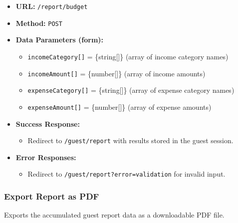 \begin{itemize}
    \item \textbf{URL:} \texttt{/report/budget}
    \item \textbf{Method:} \texttt{POST}
    \item \textbf{Data Parameters (form):}
    \begin{itemize}
        \item \texttt{incomeCategory[]} = \{string[]\} (array of income category names)
        \item \texttt{incomeAmount[]} = \{number[]\} (array of income amounts)
        \item \texttt{expenseCategory[]} = \{string[]\} (array of expense category names)
        \item \texttt{expenseAmount[]} = \{number[]\} (array of expense amounts)
    \end{itemize}
    \item \textbf{Success Response:}
    \begin{itemize}
        \item Redirect to \texttt{/guest/report} with results stored in the guest session.
    \end{itemize}
    \item \textbf{Error Responses:}
    \begin{itemize}
        \item Redirect to \texttt{/guest/report?error=validation} for invalid input.
    \end{itemize}
\end{itemize}

\subsubsection{Export Report as PDF}

Exports the accumulated guest report data as a downloadable PDF file.

